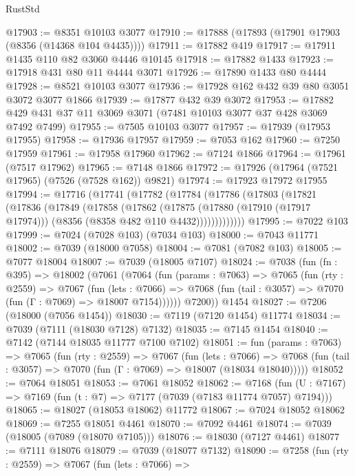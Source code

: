 \begin{lexlean}{RustStd}
\begin{coremodule}
@17903 := @8351 @10103 @3077
@17910 := @17888 (@17893 (@17901 @17903 (@8356 (@14368 @104 @4435))))
@17911 := @17882 @419
@17917 := @17911 @1435 @110 @82 @3060 @4446 @10145
@17918 := @17882 @1433
@17923 := @17918 @431 @80 @11 @4444 @3071
@17926 := @17890 @1433 @80 @4444
@17928 := @8521 @10103 @3077
@17936 := @17928 @162 @432 @39 @80 @3051 @3072 @3077 @1866
@17939 := @17877 @432 @39 @3072
@17953 := @17882 @429 @431 @37 @11 @3069 @3071 (@7481 @10103 @3077 @37 @428 @3069 @7492 @7499)
@17955 := @7505 @10103 @3077
@17957 := @17939 (@17953 @17955)
@17958 := @17936 @17957
@17959 := @7053 @162
@17960 := @7250 @17959
@17961 := @17958 @17960
@17962 := @7124 @1866
@17964 := @17961 (@7517 @17962)
@17965 := @7148 @1866
@17972 := @17926 (@17964 (@7521 @17965) (@7526 (@7528 @162)) @9821)
@17974 := @17923 @17972 @17955
@17994 := @17716
    (@17741
      (@17782
        (@17784
          (@17786
            (@17803
              (@17821
                (@17836
                  (@17849
                    (@17858
                      (@17862
                        (@17875
                          (@17880 (@17910 (@17917 @17974)))
                          (@8356 (@8358 @482 @110 @4432)))))))))))))
@17995 := @7022 @103
@17999 := @7024 (@7028 @103) (@7034 @103)
@18000 := @7043 @11771
@18002 := @7039 (@18000 @7058)
@18004 := @7081 (@7082 @103)
@18005 := @7077 @18004
@18007 := @7039 (@18005 @7107)
@18024 := @7038
    (fun (fn : @395) =>
    @18002
      (@7061
        (@7064
          (fun (params : @7063) =>
          @7065
            (fun (rty : @2559) =>
            @7067
              (fun (lets : @7066) =>
              @7068 (fun (tail : @3057) => @7070 (fun (Γ : @7069) => @18007 @7154))))))
        @7200))
    @1454
@18027 := @7206 (@18000 (@7056 @1454))
@18030 := @7119 (@7120 @1454) @11774
@18034 := @7039 (@7111 (@18030 @7128) @7132)
@18035 := @7145 @1454
@18040 := @7142 (@7144 @18035 @11777 @7100 @7102)
@18051 := fun (params : @7063) =>
  @7065
    (fun (rty : @2559) =>
    @7067
      (fun (lets : @7066) =>
      @7068 (fun (tail : @3057) => @7070 (fun (Γ : @7069) => @18007 (@18034 @18040)))))
@18052 := @7064 @18051
@18053 := @7061 @18052
@18062 := @7168
    (fun (U : @7167) => @7169 (fun (t : @7) => @7177 (@7039 (@7183 @11774 @7057) @7194)))
@18065 := @18027 (@18053 @18062) @11772
@18067 := @7024 @18052 @18062
@18069 := @7255 @18051 @4461
@18070 := @7092 @4461
@18074 := @7039 (@18005 (@7089 (@18070 @7105)))
@18076 := @18030 (@7127 @4461)
@18077 := @7111 @18076
@18079 := @7039 (@18077 @7132)
@18090 := @7258
    (fun (rty : @2559) =>
    @7067
      (fun (lets : @7066) =>

\end{coremodule}
\end{lexlean}
